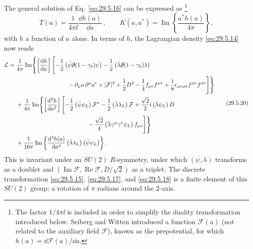 The general solution of Eq.~\eqref{eq:29.5.16} can be expressed as
\footnote{The factor \(1/4\pi \ii\) is included in order to simplify the
duality transformation introduced below. Seiberg and Witten introduced a
function \(\mathcal{F}(a)\) (not related to the auxiliary field
\(\mathcal{F}\)), known as the prepotential, for which
\(h(a)=\dd\mathcal{F}(a)/\dd a\).}
\begin{equation}
  T(a)=\frac{1}{4\pi \ii}\frac{\dd h(a)}{\dd a}\,,
  \qquad
  K(a,a^*)=\operatorname{Im}\left\{\frac{a^*h(a)}{4\pi}\right\},
  \tag{29.5.19}\label{eq:29.5.19}
\end{equation}
with \(h\) a function of \(a\) alone. In terms of \(h\), the Lagrangian
density \eqref{eq:29.5.14} now reads
\begin{equation}
  \begin{aligned}
  \mathcal{L}
  ={}&\frac{1}{4\pi}\operatorname{Im}\Biggl\{
    \left[\frac{\dd h}{\dd a}\right]\Biggl[
      -\frac12\left(\bar\psi\sl{\partial}(1-\gamma_5)\psi\right)
      -\frac12\left(\bar\lambda\sl{\partial}(1-\gamma_5)\lambda\right)
  \\
  &\hspace{31mm}
      -\partial_\mu a\,\partial^\mu a^*
      +\lvert\mathcal{F}\rvert^2+\frac12D^2
      -\frac14f_{\mu\nu}f^{\mu\nu}
      +\frac{\ii}{8}\epsilon_{\mu\nu\rho\sigma}
        f^{\mu\nu}f^{\rho\sigma}
    \Biggr]\Biggr\}
  \\
  &+\frac{1}{4\pi}\operatorname{Im}\Biggl\{
    \left[\frac{\dd^2h}{\dd a^2}\right]\Biggl[
      -\frac12\left(\bar\psi\psi_L\right)\mathcal{F}^*
      -\frac12\left(\bar\lambda\lambda_L\right)\mathcal{F}
      +\frac{\sqrt{2}}{2}\ii\left(\bar\lambda\psi_L\right)D
  \\
  &\hspace{43mm}
      -\frac{\sqrt{2}}{4}
        \left(\bar\lambda\gamma^\mu\gamma^\nu\psi_L\right)f_{\mu\nu}
    \Biggr]\Biggr\}
  \\
  &+\frac{1}{16\pi}\operatorname{Im}\left\{
    \frac{\dd^3h(a)}{\dd a^3}
    \left(\bar\lambda\lambda_L\right)\left(\bar\psi\psi_L\right)
  \right\}.
  \end{aligned}
  \tag{29.5.20}\label{eq:29.5.20}
\end{equation}
This is invariant under an \(SU(2)\) \(R\)-symmetry, under which
\((\psi,\lambda)\) transforms as a doublet and
\((\operatorname{Im}\mathcal{F},\operatorname{Re}\mathcal{F},D/\sqrt{2})\)
as a triplet. The discrete transformation \eqref{eq:29.5.15},
\eqref{eq:29.5.17}, and \eqref{eq:29.5.18} is a finite element of this
\(SU(2)\) group: a rotation of \(\pi\) radians around the 2-axis.

